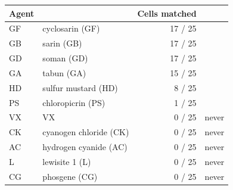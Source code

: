   \begin{tabular}{llrl}
    \hline
    Agent & & Cells matched & \\
    \hline
    GF   & cyclosarin (GF)          & 17 / 25 &  \\
    GB   & sarin (GB)               & 17 / 25 &  \\
    GD   & soman (GD)               & 17 / 25 &  \\
    GA   & tabun (GA)               & 15 / 25 &  \\
    HD   & sulfur mustard (HD)      &  8 / 25 &  \\
    PS   & chloropicrin (PS)        &  1 / 25 &  \\
    VX   & VX                       &  0 / 25 & never \\
    CK   & cyanogen chloride (CK)   &  0 / 25 & never \\
    AC   & hydrogen cyanide (AC)    &  0 / 25 & never \\
    L    & lewisite 1 (L)           &  0 / 25 & never \\
    CG   & phosgene (CG)            &  0 / 25 & never \\
    \hline
  \end{tabular}
